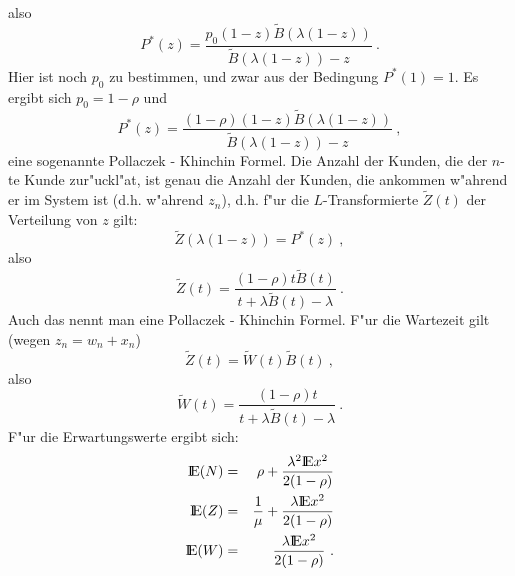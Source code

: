 also
\begin{displaymath}
P^{*}(z) = \frac{p_{0}(1-z) \tilde B ( \lambda (1-z))}{ \tilde B (
\lambda(1-z)) - z} ~.
\end{displaymath}
Hier ist noch $p_{0}$ zu bestimmen, und zwar aus der Bedingung $P^{*}(1) =
1$. Es ergibt sich $p_{0} = 1 - \rho$ und
\begin{displaymath}
P^{*}(z) = \frac{(1- \rho)(1-z) \tilde B ( \lambda (1-z))}{ \tilde B (
\lambda(1-z)) - z} ~,
\end{displaymath}
eine sogenannte Pollaczek - Khinchin Formel. Die Anzahl der Kunden, die der $n$-te
Kunde zur"uckl"a\3t, ist genau die Anzahl der Kunden, die ankommen
w"ahrend er im System ist (d.h. w"ahrend $z_{n}$), d.h. f"ur die
$L$-Transformierte $ \tilde Z (t)$ der Verteilung von $z$ gilt:
\begin{displaymath}
\tilde Z (\lambda(1-z)) = P^{*}(z) ~,
\end{displaymath}
also
\begin{displaymath}
\tilde Z (t) = \frac{(1- \rho)t \tilde B (t)}{t + \lambda \tilde B (t) -
\lambda} ~.
\end{displaymath} 
Auch das nennt man eine Pollaczek - Khinchin Formel. F"ur die Wartezeit
gilt
(wegen $z_{n} = w_{n} + x_{n}$)
\begin{displaymath}
\tilde Z (t) = \tilde W (t) \tilde B(t) ~, 
\end{displaymath} 
also
\begin{displaymath}
\tilde W (t) = \frac{(1- \rho)t}{t + \lambda \tilde B (t) - \lambda} ~.
\end{displaymath}
F"ur die Erwartungswerte ergibt sich:
\begin{eqnarray*}
{\rm I\kern-0.2em E} (N) &=& \rho + \frac{\lambda^{2} {\rm I\kern-0.2em E} x^{2}}{2(1- \rho)} \\
{\rm I\kern-0.2em E} (Z) &=& \frac{1}{\mu} + \frac{\lambda {\rm I\kern-0.2em E} x^{2}}{2(1 - \rho)} \\
{\rm I\kern-0.2em E} (W) &=& \frac{\lambda {\rm I\kern-0.2em E} x^{2}}{2(1 - \rho)} ~.
\end{eqnarray*}
